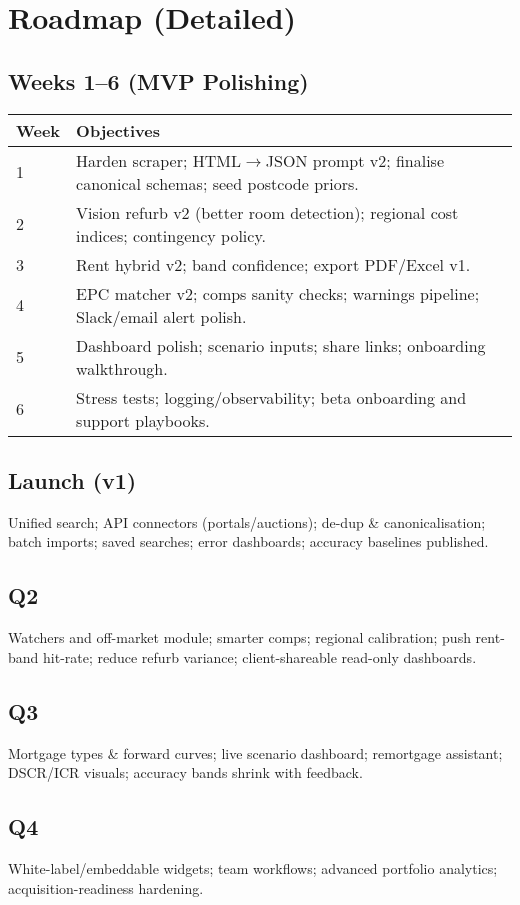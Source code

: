 \documentclass[12pt,a4paper]{article}
\begin{document}
\section{Roadmap (Detailed)}
\subsection{Weeks 1--6 (MVP Polishing)}
\begin{longtable}{@{}p{2cm}p{13.6cm}@{}}
\toprule
\textbf{Week} & \textbf{Objectives} \\
\midrule
1 & Harden scraper; HTML$\to$JSON prompt v2; finalise canonical schemas; seed postcode priors. \\
2 & Vision refurb v2 (better room detection); regional cost indices; contingency policy. \\
3 & Rent hybrid v2; band confidence; export PDF/Excel v1. \\
4 & EPC matcher v2; comps sanity checks; warnings pipeline; Slack/email alert polish. \\
5 & Dashboard polish; scenario inputs; share links; onboarding walkthrough. \\
6 & Stress tests; logging/observability; beta onboarding and support playbooks. \\
\bottomrule
\end{longtable}

\subsection{Launch (v1)}
Unified search; API connectors (portals/auctions); de-dup \& canonicalisation; batch imports; saved searches; error dashboards; accuracy baselines published.

\subsection{Q2}
Watchers and off-market module; smarter comps; regional calibration; push rent-band hit-rate; reduce refurb variance; client-shareable read-only dashboards.

\subsection{Q3}
Mortgage types \& forward curves; live scenario dashboard; remortgage assistant; DSCR/ICR visuals; accuracy bands shrink with feedback.

\subsection{Q4}
White-label/embeddable widgets; team workflows; advanced portfolio analytics; acquisition-readiness hardening.
\end{document}
